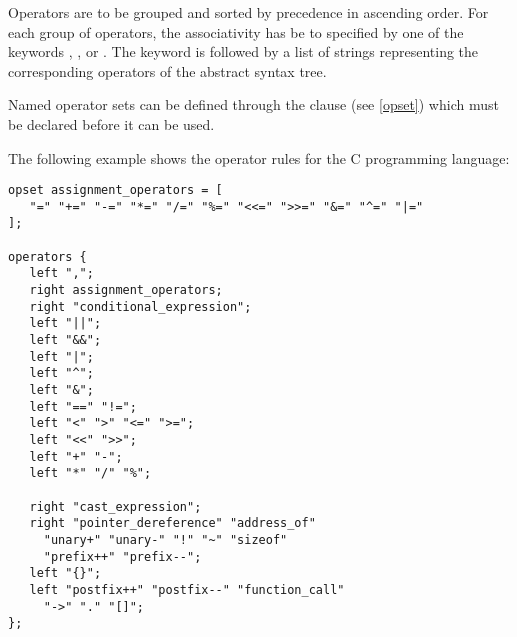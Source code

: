 \noindent
Operators are to be grouped and sorted by precedence in ascending order.
For each group of operators, the associativity has be to specified
by one of the keywords , , or .
The keyword is followed by a list of strings representing the
corresponding operators of the abstract syntax tree.

Named operator sets can be defined through the  clause
(see \ref{opset}) which must be declared before it can be used.

The following example shows the operator rules for the C
programming language:

\begin{lstlisting}
opset assignment_operators = [
   "=" "+=" "-=" "*=" "/=" "%=" "<<=" ">>=" "&=" "^=" "|="
];

operators {
   left ",";
   right assignment_operators;
   right "conditional_expression";
   left "||";
   left "&&";
   left "|";
   left "^";
   left "&";
   left "==" "!=";
   left "<" ">" "<=" ">=";
   left "<<" ">>";
   left "+" "-";
   left "*" "/" "%";

   right "cast_expression";
   right "pointer_dereference" "address_of"
	 "unary+" "unary-" "!" "~" "sizeof"
	 "prefix++" "prefix--";
   left "{}";
   left "postfix++" "postfix--" "function_call"
	 "->" "." "[]";
};
\end{lstlisting}

\endinput
